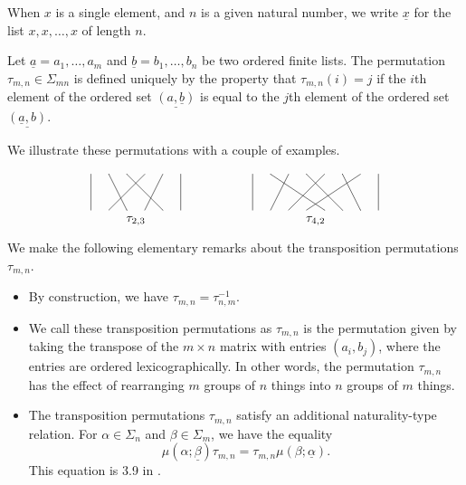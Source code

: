 \begin{nota}\label{nota:constant-list}
When $x$ is a single element, and $n$ is a given natural number, we write $\underline{x}$ for the list $x, x, \ldots, x$ of length $n$.
\end{nota}

\begin{Defi}\label{Defi:tau}
Let $\underline{a} = a_{1}, \ldots , a_{m}$ and $\underline{b} = b_{1}, \ldots, b_{n}$ be two ordered finite lists. 
The permutation $\tau_{m,n} \in \Sigma_{mn}$ is defined uniquely by the property that $\tau_{m,n}(i) = j$ if the $i$th element of the ordered set $\underline{(a, \underline{b})}$ is equal to the $j$th element of the ordered set $\underline{(\underline{a}, b)}$.
\end{Defi}

We illustrate these permutations with a couple of examples.
    \[
        \xy
            {\ar@{-} (0,0) ; (0,-10)};
            {\ar@{-} (5,0) ; (10,-10)};
            {\ar@{-} (10,0) ; (20,-10)};
            {\ar@{-} (15,0) ; (5,-10)};
            {\ar@{-} (20,0) ; (15,-10)};
            {\ar@{-} (25,0) ; (25,-10)};
            (12.5,-13)*{\tau_{2,3}};
            {\ar@{-} (45,0) ; (45,-10)};
            {\ar@{-} (50,0) ; (65,-10)};
            {\ar@{-} (55,0) ; (50,-10)};
            {\ar@{-} (60,0) ; (70,-10)};
            {\ar@{-} (65,0) ; (55,-10)};
            {\ar@{-} (70,0) ; (75,-10)};
            {\ar@{-} (75,0) ; (60,-10)};
            {\ar@{-} (80,0) ; (80,-10)};
            (62.5,-13)*{\tau_{4,2}}
        \endxy
    \]

\begin{rem}
We make the following elementary remarks about the transposition permutations $\tau_{m,n}$.
\begin{itemize}
\item By construction, we have $\tau_{m,n} = \tau_{n,m}^{-1}$.  
\item We call these transposition permutations as $\tau_{m,n}$ is the permutation given by taking the transpose of the $m \times n$ matrix with entries $(a_{i}, b_{j})$, where the entries are ordered lexicographically. In other words, the permutation $\tau_{m,n}$ has the effect of rearranging $m$ groups of $n$ things into $n$ groups of $m$ things.
\item The transposition permutations $\tau_{m,n}$ satisfy an additional naturality-type relation. For $\alpha \in \Sigma_n$ and $\beta \in \Sigma_m$, we have the equality
\[
\mu(\alpha; \underline{\beta}) \tau_{m,n} = \tau_{m,n} \mu(\beta; \underline{\alpha}).
\]
This equation is 3.9 in \cite{guillou_multiplicative}.
\end{itemize}
\end{rem}


